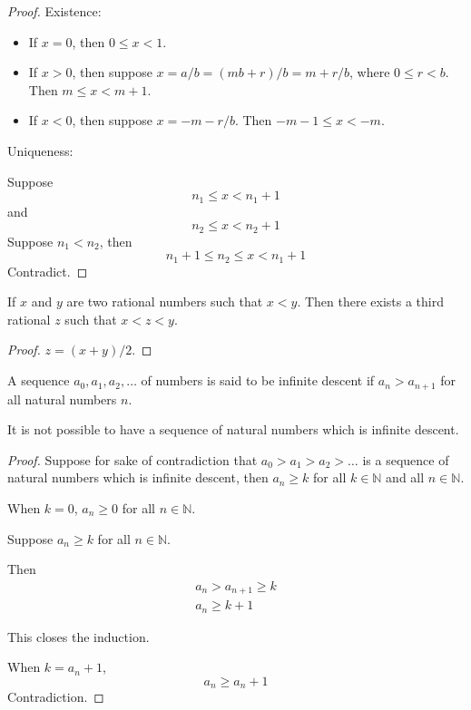 \documentclass{blog}
\begin{document}
\begin{proof}
  Existence:
  \begin{itemize}
  \item If $x = 0$, then $0 \leq x < 1$.
  \item If $x > 0$, then suppose $x = a / b = (m b + r) / b = m + r / b$,
    where $0 \leq r < b$.
    Then $m \leq x < m + 1$.
  \item If $x < 0$, then suppose $x = -m - r / b$.
    Then $-m - 1 \leq x < -m$.
  \end{itemize}
  Uniqueness:

  Suppose
  \begin{equation*}
    n_{1} \leq x < n_{1} + 1
  \end{equation*}
  and
  \begin{equation*}
    n_{2} \leq x < n_{2} + 1
  \end{equation*}
  Suppose $n_{1} < n_{2}$, then
  \begin{equation*}
    n_{1} + 1 \leq n_{2} \leq x < n_{1} + 1
  \end{equation*}
  Contradict.
\end{proof}

\begin{proposition}[intersperse]
  If $x$ and $y$ are two rational numbers such that $x < y$.
  Then there exists a third rational $z$ such that $x < z < y$.
\end{proposition}

\begin{proof}
  $z = (x + y) / 2$.
\end{proof}

\begin{definition}
  A sequence $a_{0}, a_{1}, a_{2}, \dots$ of numbers is said to be infinite descent if
  $a_{n} > a_{n + 1}$ for all natural numbers $n$.
\end{definition}

\begin{lemma}
  It is not possible to have a sequence of natural numbers which is infinite descent.
\end{lemma}

\begin{proof}
  Suppose for sake of contradiction that
  $a_{0} > a_{1} > a_{2} > \dots$ is a sequence of natural numbers which is infinite descent,
  then $a_{n} \geq k$ for all $k \in \mathbb{N}$ and all $n \in \mathbb{N}$.

  When $k = 0$, $a_{n} \geq 0$ for all $n \in \mathbb{N}$.

  Suppose $a_{n} \geq k$ for all $n \in \mathbb{N}$.

  Then
  \begin{gather*}
    a_{n} > a_{n + 1} \geq k \\
    a_{n} \geq k + 1
  \end{gather*}

  This closes the induction.

  When $k = a_{n} + 1$,
  \begin{equation*}
    a_{n} \geq a_{n} + 1
  \end{equation*}
  Contradiction.
\end{proof}
\end{document}
